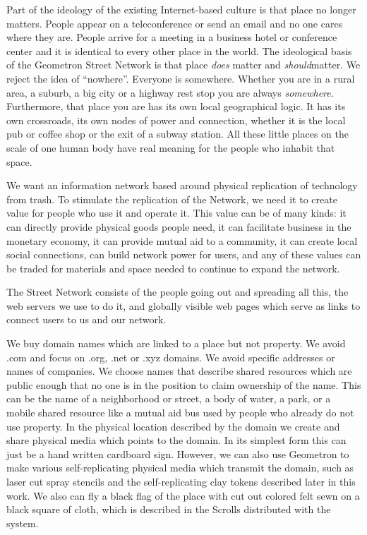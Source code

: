 Part of the ideology of the existing Internet-based culture is that
place no longer matters. People appear on a teleconference or send an
email and no one cares where they are. People arrive for a meeting in a
business hotel or conference center and it is identical to every other
place in the world. The ideological basis of the Geometron Street
Network is that place \emph{does} matter and \emph{should}matter. We
reject the idea of ``nowhere''. Everyone is somewhere. Whether you are
in a rural area, a suburb, a big city or a highway rest stop you are
always \emph{somewhere}. Furthermore, that place you are has its own
local geographical logic. It has its own crossroads, its own nodes of
power and connection, whether it is the local pub or coffee shop or the
exit of a subway station. All these little places on the scale of one
human body have real meaning for the people who inhabit that space.

We want an information network based around physical replication of
technology from trash. To stimulate the replication of the Network, we
need it to create value for people who use it and operate it. This value
can be of many kinds: it can directly provide physical goods people
need, it can facilitate business in the monetary economy, it can provide
mutual aid to a community, it can create local social connections, can
build network power for users, and any of these values can be traded for
materials and space needed to continue to expand the network.

The Street Network consists of the people going out and spreading all
this, the web servers we use to do it, and globally visible web pages
which serve as links to connect users to us and our network.

We buy domain names which are linked to a place but not property. We
avoid .com and focus on .org, .net or .xyz domains. We avoid specific
addresses or names of companies. We choose names that describe shared
resources which are public enough that no one is in the position to
claim ownership of the name. This can be the name of a neighborhood or
street, a body of water, a park, or a mobile shared resource like a
mutual aid bus used by people who already do not use property. In the
physical location described by the domain we create and share physical
media which points to the domain. In its simplest form this can just be
a hand written cardboard sign. However, we can also use Geometron to
make various self-replicating physical media which transmit the domain,
such as laser cut spray stencils and the self-replicating clay tokens
described later in this work. We also can fly a black flag of the place
with cut out colored felt sewn on a black square of cloth, which is
described in the Scrolls distributed with the system.

